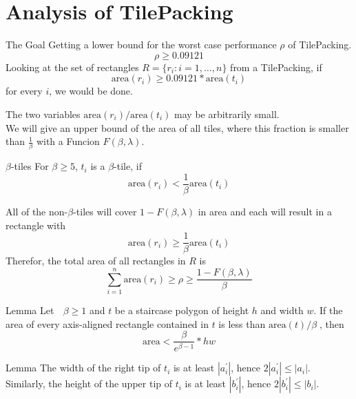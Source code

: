 \section{Analysis of TilePacking}
\begin{frame}{The Goal}
	Getting a lower bound for the worst case performance $\rho$ of TilePacking.
	\begin{equation*}
		\rho \geq 0.09121
	\end{equation*}
	Looking at the set of rectangles $R = \{r_i:i=1,\ldots,n\}$ from a TilePacking, if
	\begin{equation*}
		\text{area}(r_i) \geq 0.09121 * \text{area}(t_i)
	\end{equation*}
	for every $i$, we would be done.
\end{frame}

\begin{frame}{The two variables}
	$\text{area}(r_i)/\text{area}(t_i)$ may be arbitrarily small.\\
	We will give an upper bound of the area of all tiles, where this fraction is smaller than $\frac{1}{\beta}$ with a Funcion $F(\beta, \lambda)$.
\end{frame}

\begin{frame}{$\beta$-tiles}
	For $\beta \geq 5$, $t_i$ is a $\beta$-tile, if
	\begin{equation*}
		\text{area}(r_i) < \frac{1}{\beta} \text{area}(t_i)
	\end{equation*}
\end{frame}

\begin{frame}
	All of the non-$\beta$-tiles will cover $1 - F(\beta, \lambda)$ in area and each will result in a rectangle with
	\begin{equation*}
		\text{area}(r_i) \geq \frac{1}{\beta} \text{area}(t_i)
	\end{equation*}
	Therefor, the total area of all rectangles in $R$ is
	\begin{equation}
		\sum^n_{i=1}\text{area}(r_i) \geq \rho \geq \frac{1 - F(\beta, \lambda)}{\beta}
	\end{equation}
\end{frame}


\begin{frame}{Lemma}
	Let  $\beta \geq 1$ and $t$ be a staircase polygon of height $h$ and
width $w$. If the area of every axis-aligned rectangle contained in $t$ is less than $\text{area}(t)/\beta$, then
	\begin{equation}
		\text{area} < \frac{\beta}{e^{\beta - 1}} * hw
	\end{equation}
\end{frame}



\begin{frame}{Lemma}
	The width of the right tip of $t_i$ is at least $|a^\prime_i|$, hence $2|a_i^\prime| \leq |a_i|$. Similarly, the height of the upper tip of $t_i$ is at least $|b_i^\prime|$, hence $2|b_i^\prime| \leq |b_i|$.
\end{frame}

